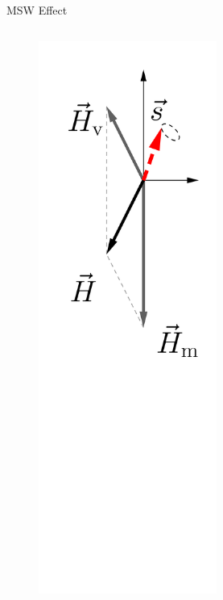 \documentclass[9pt]{beamer}
\begin{document}
\begin{darkframes}
\begin{frame}{MSW Effect}
{\begin{columns}[T]
\begin{column}{0.33\textwidth}
\begin{figure}
    \centering
    \colorbox{white}{\includegraphics[width=0.6\textwidth]{assets/matter-effect-adiabatic}}
\end{figure}



\end{column}
\begin{column}{0.33\textwidth}




\end{column}
\end{columns}}
\end{frame}
\end{darkframes}
\end{document}
